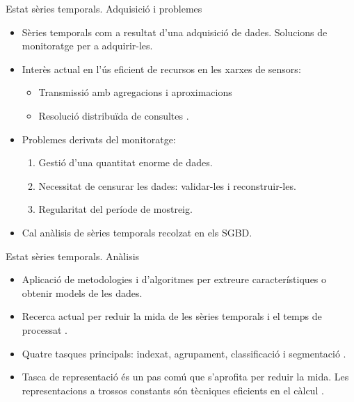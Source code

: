 \begin{frame}{Estat sèries temporals. Adquisició i problemes}

  \begin{itemize}

  \item Sèries temporals com a resultat d'una adquisició de
    dades. Solucions de monitoratge per a adquirir-les.

  \item Interès actual en l'ús eficient de recursos en les xarxes de
    sensors: 
    \begin{itemize}
    \item Transmissió amb agregacions i
      aproximacions \parencite{deligiannakis07}
    \item Resolució distribuïda de consultes \parencite{bonnet01}.
    \end{itemize}

  \item Problemes derivats del monitoratge:
    \begin{enumerate}

    \item Gestió d'una quantitat enorme de dades. 

    \item Necessitat de censurar les dades: validar-les i reconstruir-les.

    \item Regularitat del període de mostreig.

    \end{enumerate}
  

  \item Cal anàlisis de sèries temporals recolzat en els SGBD.

  \end{itemize}


\end{frame}




\begin{frame}{Estat sèries temporals. Anàlisis}

  \begin{itemize}

  \item Aplicació de metodologies i d'algoritmes per extreure
    característiques o obtenir models de les dades.

  \item Recerca actual per reduir la mida de les sèries temporals i el
    temps de processat \parencite{fu11}. 

  \item Quatre tasques principals: indexat, agrupament, classificació i segmentació \parencite{keogh02}.

  \item Tasca de representació és un pas comú que s'aprofita per
    reduir la mida.  Les representacions a trossos constants són
    tècniques eficients en el càlcul \parencite{keogh00}.

  \end{itemize}

\end{frame}





